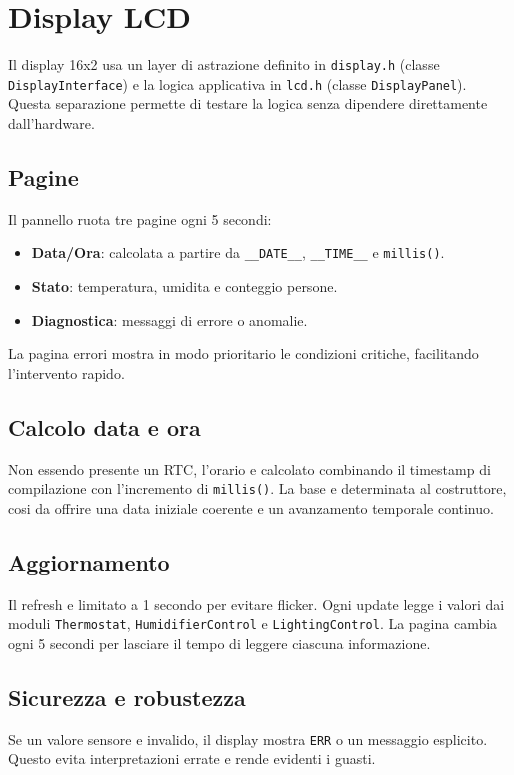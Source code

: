 \chapter{Display LCD}

Il display 16x2 usa un layer di astrazione definito in \texttt{display.h} (classe \texttt{DisplayInterface}) e la logica applicativa in \texttt{lcd.h} (classe \texttt{DisplayPanel}). Questa separazione permette di testare la logica senza dipendere direttamente dall'hardware.

\section{Pagine}
Il pannello ruota tre pagine ogni 5 secondi:
\begin{itemize}
  \item \textbf{Data/Ora}: calcolata a partire da \texttt{\_\_DATE\_\_}, \texttt{\_\_TIME\_\_} e \texttt{millis()}.
  \item \textbf{Stato}: temperatura, umidita e conteggio persone.
  \item \textbf{Diagnostica}: messaggi di errore o anomalie.
\end{itemize}
La pagina errori mostra in modo prioritario le condizioni critiche, facilitando l'intervento rapido.

\section{Calcolo data e ora}
Non essendo presente un RTC, l'orario e calcolato combinando il timestamp di compilazione con l'incremento di \texttt{millis()}. La base e determinata al costruttore, cosi da offrire una data iniziale coerente e un avanzamento temporale continuo.

\section{Aggiornamento}
Il refresh e limitato a 1 secondo per evitare flicker. Ogni update legge i valori dai moduli \texttt{Thermostat}, \texttt{HumidifierControl} e \texttt{LightingControl}. La pagina cambia ogni 5 secondi per lasciare il tempo di leggere ciascuna informazione.

\section{Sicurezza e robustezza}
Se un valore sensore e invalido, il display mostra \texttt{ERR} o un messaggio esplicito. Questo evita interpretazioni errate e rende evidenti i guasti.
